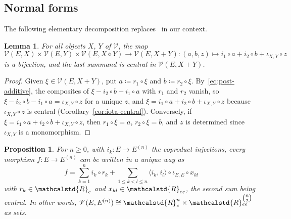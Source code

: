 \documentclass[reqno,a4paper]{amsart}
\renewcommand{\binom}{\tbinom} %
\theoremstyle{plain}
\newtheorem{lemma}[subsection]{Lemma}
\newtheorem{proposition}[subsection]{Proposition}
\theoremstyle{definition}
\newcommand{\DefEq}{\coloneq}
\newcommand{\V}{\ensuremath{\mathcal{V}}}
\newcommand{\R}{\ensuremath{\mathcalstd{R}}}
\newcommand{\cosmash}{\ensuremath{\diamond}}
\renewcommand{\Re}{\ensuremath{\R_{e}}}
\newcommand{\Ree}{\ensuremath{\R_{ee}}}
\begin{document}
\subsection{Normal forms}\label{sec:normal-forms}
The following elementary decomposition replaces~\cite[Corollary~2.10]{BHP} in our context.

\begin{lemma}\label{lem:decomposition}
  For all objects \(X\), \(Y\) of \(\V\), the map
  \[
    \V(E,X)\times\V(E,Y)\times\V(E,X\cosmash Y)\to\V(E,X+Y)\colon (a,b,z)\mapsto i_{1}\circ a+i_{2}\circ b+\iota_{X,Y}\circ z
  \]
  is a bijection, and the last summand is central in \(\V(E,X+Y)\).
\end{lemma}

\begin{proof}
  Given \(\xi\in\V(E,X+Y)\), put \(a\DefEq r_{1}\circ\xi\) and \(b\DefEq r_{2}\circ\xi\). By~\eqref{eq:post-additive}, the composites of \(\xi-i_{2}\circ b-i_{1}\circ a\) with \(r_{1}\) and \(r_{2}\) vanish, so \(\xi-i_{2}\circ b-i_{1}\circ a=\iota_{X,Y}\circ z\) for a unique \(z\), and \(\xi=i_{1}\circ a+i_{2}\circ b+\iota_{X,Y}\circ z\) because \(\iota_{X,Y}\circ z\) is central (Corollary~\ref{cor:iota-central}). Conversely, if \(\xi=i_{1}\circ a+i_{2}\circ b+\iota_{X,Y}\circ z\), then \(r_{1}\circ\xi=a\), \(r_{2}\circ\xi=b\), and \(z\) is determined since \(\iota_{X,Y}\) is a monomorphism.
\end{proof}

\begin{proposition}\label{prop:normal-form-V}
  For \(n\geq 0\), with \(i_{k}\colon E\to E^{(n)}\) the coproduct injections, every morphism \(f\colon E\to E^{(n)}\) can be written in a unique way as
  \begin{equation}\label{eq:normal-form-V}
    f=\sum_{k=1}^{n}i_{k}\circ r_{k}+\sum_{1\leq k<l\leq n}\langle i_{k},i_{l}\rangle\circ\iota_{E,E}\circ x_{kl}
  \end{equation}
  with \(r_{k}\in\Re\) and \(x_{kl}\in\Ree\), the second sum being central. In other words, \(\V(E,E^{(n)})\cong\Re^{n}\times\Ree^{\binom{n}{2}}\) as sets.
\end{proposition}
\end{document}
